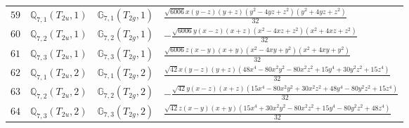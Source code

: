 \documentclass[fleqn,8pt,landscape]{jsarticle}
\begin{document}
\begin{table}[ht!]
\begin{center}
\begin{tabular}{cccl}
$ 59 $ & $ \mathbb{Q}_{7,1}(T_{2u},1) $ & $ \mathbb{G}_{7,1}(T_{2g},1) $ & $ \frac{\sqrt{6006} x \left(y - z\right) \left(y + z\right) \left(y^{2} - 4 y z + z^{2}\right) \left(y^{2} + 4 y z + z^{2}\right)}{32} $ \\
$ 60 $ & $ \mathbb{Q}_{7,2}(T_{2u},1) $ & $ \mathbb{G}_{7,2}(T_{2g},1) $ & $ - \frac{\sqrt{6006} y \left(x - z\right) \left(x + z\right) \left(x^{2} - 4 x z + z^{2}\right) \left(x^{2} + 4 x z + z^{2}\right)}{32} $ \\
$ 61 $ & $ \mathbb{Q}_{7,3}(T_{2u},1) $ & $ \mathbb{G}_{7,3}(T_{2g},1) $ & $ \frac{\sqrt{6006} z \left(x - y\right) \left(x + y\right) \left(x^{2} - 4 x y + y^{2}\right) \left(x^{2} + 4 x y + y^{2}\right)}{32} $ \\
$ 62 $ & $ \mathbb{Q}_{7,1}(T_{2u},2) $ & $ \mathbb{G}_{7,1}(T_{2g},2) $ & $ \frac{\sqrt{42} x \left(y - z\right) \left(y + z\right) \left(48 x^{4} - 80 x^{2} y^{2} - 80 x^{2} z^{2} + 15 y^{4} + 30 y^{2} z^{2} + 15 z^{4}\right)}{32} $ \\
$ 63 $ & $ \mathbb{Q}_{7,2}(T_{2u},2) $ & $ \mathbb{G}_{7,2}(T_{2g},2) $ & $ - \frac{\sqrt{42} y \left(x - z\right) \left(x + z\right) \left(15 x^{4} - 80 x^{2} y^{2} + 30 x^{2} z^{2} + 48 y^{4} - 80 y^{2} z^{2} + 15 z^{4}\right)}{32} $ \\
$ 64 $ & $ \mathbb{Q}_{7,3}(T_{2u},2) $ & $ \mathbb{G}_{7,3}(T_{2g},2) $ & $ \frac{\sqrt{42} z \left(x - y\right) \left(x + y\right) \left(15 x^{4} + 30 x^{2} y^{2} - 80 x^{2} z^{2} + 15 y^{4} - 80 y^{2} z^{2} + 48 z^{4}\right)}{32} $ \\
 \hline \hline
\end{tabular}
\end{center}
\end{table}
\end{document}
